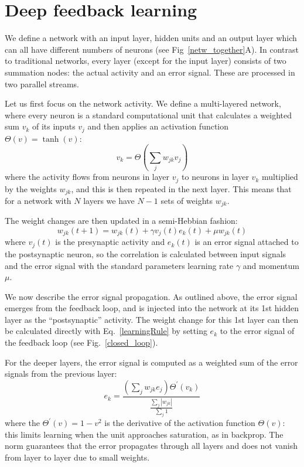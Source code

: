 \documentclass{article}
\begin{document}
\section{Deep feedback learning}
We define a network with an input layer, hidden units and an output
layer which can all have different numbers of neurons (see
Fig~\ref{netw_together}A). In contrast to traditional
networks, every layer (except for the input layer) consists of two
summation nodes: the actual activity and an error signal. These
are processed in two parallel streams.

Let us first focus on the network activity. We define a multi-layered
network, where every neuron is a standard computational unit that
calculates a weighted sum $v_k$ of its inputs $v_j$ and then applies
an activation function $\Theta(v) = \tanh(v)$:
\begin{equation}
  v_k = \Theta\left( \sum_j w_{jk} v_{j} \right) \label{act_sum}
\end{equation}
where the activity flows from neurons in layer $v_j$ to neurons in
layer $v_k$ multiplied by the weights $w_{jk}$, and this
is then repeated in the next layer. This means that for a network with
$N$ layers we have $N-1$ sets of weights $w_{jk}$.

The weight changes are then updated in a semi-Hebbian fashion:
\begin{equation}
  w_{jk}(t+1) = w_{jk}(t) + \gamma v_j(t)  e_k(t) + \mu w_{jk}(t) \label{learningRule}
\end{equation}
where $v_j(t)$ is the presynaptic activity and $e_k(t)$ is an error
signal attached to the postsynaptic neuron, so the correlation is
calculated between input signals and the error signal with the
standard parameters learning rate $\gamma$ and momentum $\mu$.

We now describe the error signal propagation. As outlined above, the
error signal emerges from the feedback loop, and is injected into the
network at its 1st hidden layer as the ``postsynaptic'' activity. The
weight change for this 1st layer can then be calculated directly with
Eq.~\ref{learningRule} by setting $e_k$ to the error signal of the
feedback loop (see Fig.~\ref{closed_loop}).

For the deeper layers, the error signal is computed as a weighted
sum of the error signals from the previous layer:
\begin{equation}
  e_k = \frac{\left( \sum_j w_{jk} e_{j} \right) \Theta^\prime (v_k) }{\frac{\sum_j {|w_{jk}|}}{\sum_j 1}}
  \label{deepError}
\end{equation}
where the $\Theta^\prime (v) = 1 - v^2$ is the derivative of the
activation function $\Theta(v)$: this limits learning when the unit
approaches saturation, as in backprop. The norm guarantees that
the error propagates through all layers and does not vanish from
layer to layer due to small weights.
\end{document}
